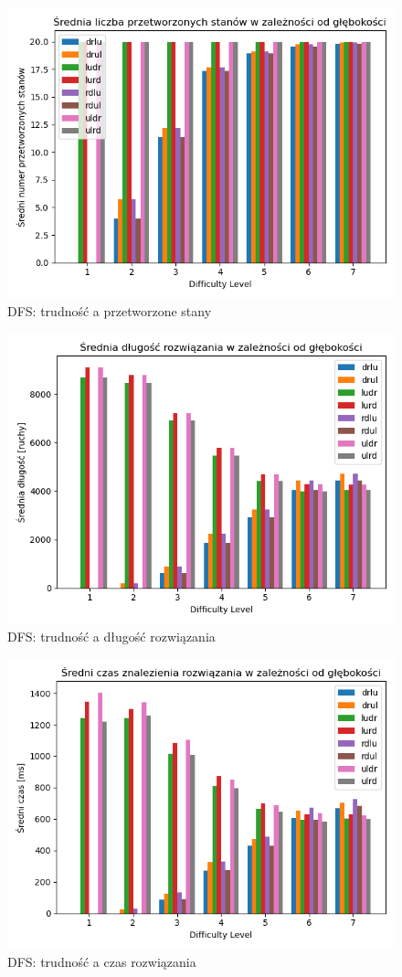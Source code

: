 \documentclass{classrep}
\begin{document}
\begin{figure}[p] \centering
 \includegraphics[width=0.9\linewidth]{./pic/dfs_proc_c_vs_diff.png}
 \caption{DFS: trudność a przetworzone stany}
\end{figure}
\begin{figure}[p] \centering
 \includegraphics[width=0.9\linewidth]{./pic/dfs_sol_len_vs_diff.png}
 \caption{DFS: trudność a długość rozwiązania}
\end{figure}
\begin{figure}[p] \centering
 \includegraphics[width=0.9\linewidth]{./pic/dfs_time_vs_diff.png}
 \caption{DFS: trudność a czas rozwiązania}
\end{figure}
\end{document}
